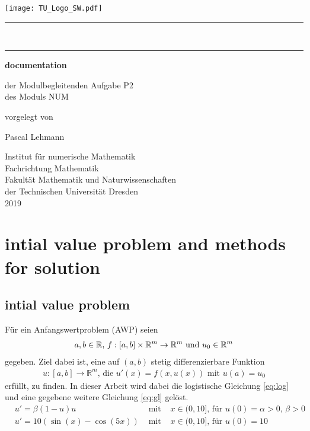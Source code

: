 \documentclass[
paper=A4,fontsize=12pt,
BCOR=15mm,DIV=22,
headinclude=true,footinclude=false,
parskip=full,
numbers=noendperiod,
ngerman,fleqn,             %
bibliography=totoc, %
toc=listof, %
cleardoublepage=empty,      %
version = last
]{scrartcl}
\newcommand{\R}{\mathbb{R}}
\begin{document}

\begin{titlepage}
	{
		\flushleft\texttt{[image: TU\_Logo\_SW.pdf]}\\[-2mm]
		\rule{\textwidth}{0.5pt}\\[-3.7mm]
		\rule{\textwidth}{0.5pt}
	}
	
	\centering\large
	{\huge\bfseries documentation}
	
	{der Modulbegleitenden Aufgabe P2\\
		des Moduls NUM
	}
	
	vorgelegt von
	
	{\Large Pascal Lehmann}
	
	Institut für numerische Mathematik\\
	Fachrichtung Mathematik\\
	Fakultät Mathematik und Naturwissenschaften\\
	der Technischen Universität Dresden\\
	2019
\end{titlepage}


\setcounter{page}{1}

\tableofcontents
\clearpage

\setcounter{page}{1}

\section{intial value problem and methods for solution}
\subsection{intial value problem}
Für ein Anfangswertproblem (AWP) seien
\begin{align}
\notag 
a,b\in \R\text{, } f:[a,b]\times\R^m\to\R^m \text{ und } u_0\in\R^m
\end{align}
gegeben.
Ziel dabei ist, eine auf $(a,b)$ stetig differenzierbare Funktion 
\begin{align}
\label{eq:AWP}
u:[a,b]\to\R^m \text{, die } u'(x)=f(x,u(x)) \text{ mit } u(a)=u_0
\end{align}
erfüllt, zu finden.
In dieser Arbeit wird dabei die logistische Gleichung \eqref{eq:log} und eine gegebene weitere Gleichung \eqref{eq:gl} gelöst.
\begin{align}
\label{eq:log}
& u'=\beta (1-u)u & \text{ mit } & x\in (0,10] \text{, für }u(0)=\alpha > 0 \text{, } \beta > 0 \\
\label{eq:gl}
&u'=10(\sin(x)-\cos(5x))& \text{ mit }& x\in (0,10] \text{, für } u(0)= 10 
\end{align}
\end{document}
